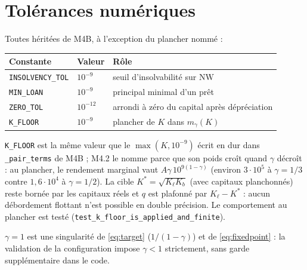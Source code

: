 \documentclass[11pt,a4paper]{article}
\newcommand{\code}[1]{\texttt{#1}}
\newcommand{\NW}{\mathrm{NW}}
\begin{document}
\section{Tolérances numériques}
\label{sec:tol}

Toutes héritées de M4B, à l'exception du plancher nommé :
\begin{center}
\begin{tabular}{lll}
\toprule
Constante & Valeur & Rôle\\
\midrule
\code{INSOLVENCY\_TOL} & $10^{-9}$ & seuil d'insolvabilité sur $\NW$\\
\code{MIN\_LOAN} & $10^{-9}$ & principal minimal d'un prêt\\
\code{ZERO\_TOL} & $10^{-12}$ & arrondi à zéro du capital après dépréciation\\
\code{K\_FLOOR} & $10^{-9}$ & plancher de $K$ dans $m_\gamma(K)$\\
\bottomrule
\end{tabular}
\end{center}

\code{K\_FLOOR} est la même valeur que le $\max(K,10^{-9})$ écrit en dur
dans \code{\_pair\_terms} de M4B ; M4.2 le nomme parce que son poids croît
quand $\gamma$ décroît : au plancher, le rendement marginal vaut
$A\gamma\,10^{9(1-\gamma)}$ (environ $3{\cdot}10^{5}$ à $\gamma=1/3$ contre
$1{,}6{\cdot}10^{4}$ à $\gamma=1/2$). La cible $K^*=\sqrt{K_\ell K_b}$
(avec capitaux planchonnés) reste bornée par les capitaux réels et $q$ est
plafonné par $K_\ell-K^{*}$ : aucun débordement flottant n'est possible en
double précision. Le comportement au plancher est testé
(\code{test\_k\_floor\_is\_applied\_and\_finite}).

$\gamma=1$ est une singularité de \eqref{eq:target} ($1/(1-\gamma)$) et de
\eqref{eq:fixedpoint} : la validation de la configuration impose
$\gamma<1$ strictement, sans garde supplémentaire dans le code.
\end{document}
